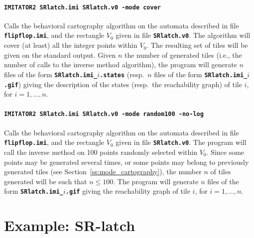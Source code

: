 \documentclass[a4paper,10pt]{article}
\newcommand{\imitatordeuxExec}{\code{IMITATOR2}}
\newcommand{\code}[1]{\textbf{\texttt{#1}}}
\begin{document}
\paragraph{\code{\imitatordeuxExec{} SRlatch.imi SRlatch.v0 -mode cover}}
Calls the behavioral cartography algorithm on the automata described in file \code{flipflop.imi}, and the rectangle $V_0$ given in file \code{SRlatch.v0}.
The algorithm will cover (at least) all the integer points within $V_0$.
The resulting set of tiles will be given on the standard output.
Given $n$ the number of generated tiles (i.e., the number of calls to the inverse method algorithm), the program will generate $n$ files of the form \code{SRlatch.imi\_$i$.states} (resp.~$n$ files of the form \code{SRlatch.imi\_$i$.gif}) giving the description of the states (resp.~the reachability graph) of tile $i$, for $i = 1, \dots, n$.


\paragraph{\code{\imitatordeuxExec{} SRlatch.imi SRlatch.v0 -mode random100 -no-log}}
Calls the behavioral cartography algorithm on the automata described in file \code{flipflop.imi}, and the rectangle $V_0$ given in file \code{SRlatch.v0}.
The program will call the inverse method on 100 points randomly selected within $V_0$.
Since some points may be generated several times, or some points may belong to previously generated tiles (see Section~\ref{ss:mode_cartography}), the number $n$ of tiles generated will be such that $n \leq 100$.
The program will generate $n$ files of the form \code{SRlatch.imi\_$i$.gif} giving the reachability graph of tile $i$, for $i = 1, \dots, n$.



\section{Example: SR-latch} \label{sec:example}
\end{document}
